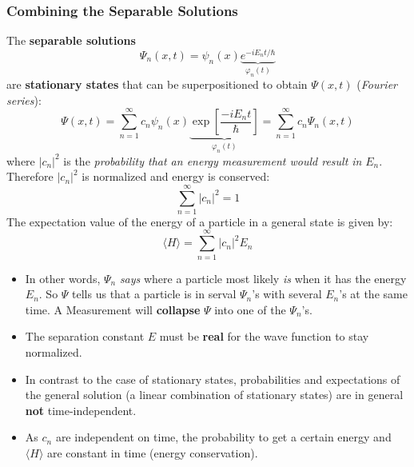 \subsubsection{Combining the Separable Solutions}
The \textbf{separable solutions}
\noindent\begin{equation*}
    \Psi_n(x,t)=\psi_n(x)\underbrace{e^{-iE_n t/\hbar}}_{\varphi_n(t)}
\end{equation*}
are \textbf{stationary states} that can be superpositioned to obtain $\Psi(x,t)$ (\textit{Fourier series}):
\noindent\begin{equation*}
    \Psi(x,t) =\sum_{n=1}^\infty c_n\psi_n(x) \underbrace{\exp\left[\frac{-iE_n t}{\hbar}\right]}_{\varphi_n(t)}=\sum_{n=1}^\infty c_n\Psi_n(x,t)
\end{equation*}
where $|c_n|^2$ is the \textit{probability that an energy measurement would result in} $E_n$. Therefore $|c_n|^2$ is normalized and energy is conserved:
\noindent\begin{equation*}
    \sum_{n=1}^\infty|c_n|^2 =1
\end{equation*}
The expectation value of the energy of a particle in a general state is given by:
\noindent\begin{equation*}
    \langle H\rangle=\sum_{n=1}^\infty|c_n|^2E_n
\end{equation*}

\begin{itemize}
    \item In other words, $\Psi_n$ \textit{says} where a particle most likely \textit{is} when it has the energy $E_n$. So $\Psi$ tells us that a particle is in serval $\Psi_n$'s with several $E_n$'s at the same time. A Measurement will \textbf{collapse} $\Psi$ into one of the $\Psi_n$'s.
    \item The separation constant $E$ must be \textbf{real} for the wave function to stay normalized.
    \item In contrast to the case of stationary states, probabilities and expectations of the general solution (a linear combination of stationary states) are in general \textbf{not} time-independent.
    \item As $c_n$ are independent on time, the probability to get a certain energy and $\langle H\rangle$ are constant in time (energy conservation).
\end{itemize}

